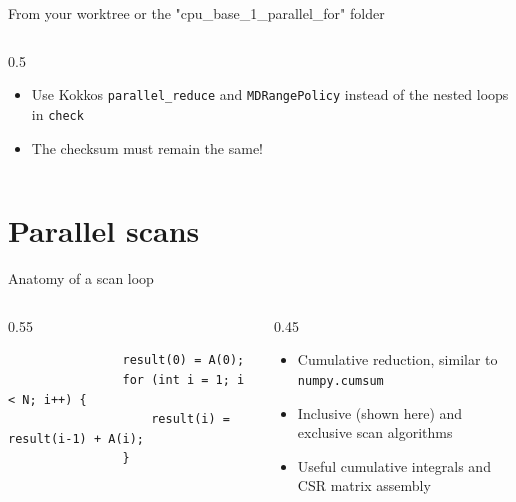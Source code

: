 \documentclass[
    aspectratio=169,
]{beamer}
\begin{document}
\begin{exerciseframe}{\small From your worktree or the "cpu\_base\_1\_parallel\_for" folder}
    \begin{columns}
        \begin{column}{0.5\linewidth}
            \begin{itemize}
                \item Use Kokkos \texttt{parallel\_reduce} and \texttt{MDRangePolicy} instead of the nested loops in \texttt{check}
                \item The checksum must remain the same!
            \end{itemize}
        \end{column}
    \end{columns}
\end{exerciseframe}

\section{Parallel scans}

\begin{frame}[fragile]{Anatomy of a scan loop}
    \begin{columns}
        \begin{column}{0.55\linewidth}
            \begin{verbatim}
                result(0) = A(0);
                for (int i = 1; i < N; i++) {
                    result(i) = result(i-1) + A(i);
                }
            \end{verbatim}
        \end{column}
        \begin{column}{0.45\linewidth}
            \begin{itemize}
                \item Cumulative reduction, similar to \texttt{numpy.cumsum}
                \item Inclusive (shown here) and exclusive scan algorithms
                \item Useful cumulative integrals and CSR matrix assembly
            \end{itemize}
        \end{column}
    \end{columns}
\end{frame}
\end{document}
